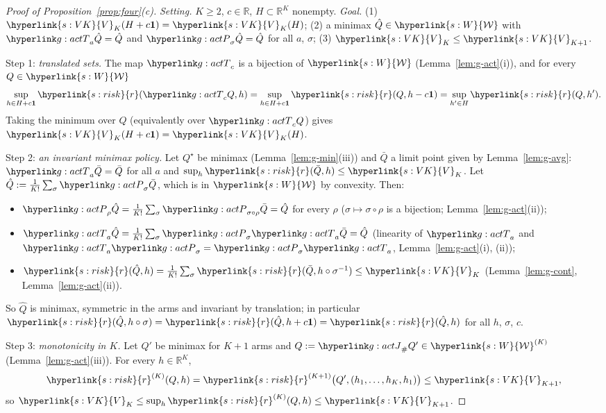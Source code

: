 \documentclass[11pt]{article}
\DeclareRobustCommand{\sy}[2]{{\hyperlink{#1}{#2}}}
\newcommand{\R}{\mathbb{R}}
\newcommand{\1}{\mathbf{1}}
\newcommand{\Wc}{\sy{s:W}{\mathcal W}}
\newcommand{\rk}{\sy{s:risk}{r}}
\newcommand{\VK}{\sy{s:VK}{V}}
\begin{document}
\begin{proof}[Proof of Proposition~\ref{prop:four}(c)]
\textit{Setting.} $K\ge2$, $c\in\R$, $H\subset\R^K$ nonempty. \textit{Goal.} (1) $\VK_K(H+c\1)=\VK_K(H)$; (2) a minimax $\hat Q\in\Wc$ with $\gTc_a\hat Q=\hat Q$ and
$\gPs_\sigma\hat Q=\hat Q$ for all $a$, $\sigma$; (3) $\VK_K\le\VK_{K+1}$.

Step 1: \emph{translated sets.} The map $\gTc_c$ is a bijection of $\Wc$ (Lemma~\ref{lem:g-act}(i)), and for every $Q\in\Wc$
\[
\sup_{h\in H+c\1}\rk(\gTc_cQ,h)=\sup_{h\in H+c\1}\rk(Q,h-c\1)=\sup_{h'\in H}\rk(Q,h').
\]
Taking the minimum over $Q$ (equivalently over $\gTc_cQ$) gives $\VK_K(H+c\1)=\VK_K(H)$.

Step 2: \emph{an invariant minimax policy.} Let $Q^\star$ be minimax (Lemma~\ref{lem:g-min}(iii)) and $\bar Q$ a limit point given by Lemma~\ref{lem:g-avg}: $\gTc_a\bar Q=\bar Q$
for all $a$ and $\sup_h\rk(\bar Q,h)\le\VK_K$. Let $\hat Q:=\frac1{K!}\sum_\sigma\gPs_\sigma\bar Q$, which is in $\Wc$ by convexity. Then:
\begin{itemize}
\item $\gPs_\rho\hat Q=\frac1{K!}\sum_\sigma\gPs_{\sigma\circ\rho}\bar Q=\hat Q$ for every $\rho$ ($\sigma\mapsto\sigma\circ\rho$ is a bijection; Lemma~\ref{lem:g-act}(ii));
\item $\gTc_a\hat Q=\frac1{K!}\sum_\sigma\gPs_\sigma\gTc_a\bar Q=\hat Q$ (linearity of $\gTc_a$ and $\gTc_a\gPs_\sigma=\gPs_\sigma\gTc_a$, Lemma~\ref{lem:g-act}(i), (ii));
\item $\rk(\hat Q,h)=\frac1{K!}\sum_\sigma\rk(\bar Q,h\circ\sigma^{-1})\le\VK_K$ (Lemma~\ref{lem:g-cont}, Lemma~\ref{lem:g-act}(ii)).
\end{itemize}
So $\hat Q$ is minimax, symmetric in the arms and invariant by translation; in particular $\rk(\hat Q,h\circ\sigma)=\rk(\hat Q,h+c\1)=\rk(\hat Q,h)$ for all $h$, $\sigma$, $c$.

Step 3: \emph{monotonicity in $K$.} Let $Q'$ be minimax for $K+1$ arms and $Q:=\gJ_\#Q'\in\Wc^{(K)}$ (Lemma~\ref{lem:g-act}(iii)). For every $h\in\R^K$,
\[
\rk^{(K)}(Q,h)=\rk^{(K+1)}\big(Q',(h_1,\dots,h_K,h_1)\big)\le\VK_{K+1},
\]
so $\VK_K\le\sup_h\rk^{(K)}(Q,h)\le\VK_{K+1}$.
\end{proof}
\end{document}
